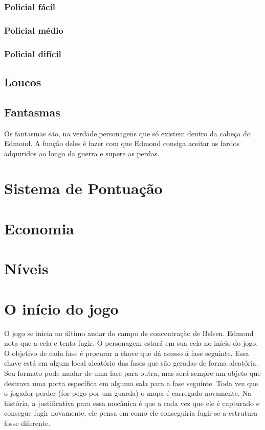 \documentclass{article}
\begin{document}
\subsubsection{Policial fácil}
\subsubsection{Policial médio}
\subsubsection{Policial difícil}
\subsection{Loucos}
\subsection{Fantasmas}
Os fantasmas são, na verdade,personagens que só existem dentro da cabeça do Edmond. A função deles é fazer com que Edmond consiga aceitar os fardos adquiridos ao longo da guerra e supere as perdas.

\section{Sistema de Pontuação}
\section{Economia}
\section{Níveis}

\section{O início do jogo}
    O jogo se inicia no último andar do campo de concentração de Belsen. Edmond nota que a cela e tenta fugir. O personagem estará em sua cela no início do jogo. O objetivo de cada fase é procurar a chave que dá acesso á fase seguinte. Essa chave está em algum local aleatório das fases que são geradas de forma aleatória. Seu formato pode mudar de uma fase para outra, mas será sempre um objeto que destrava uma porta específica em alguma sala para a fase seguinte. Toda vez que o jogador perder (for pego por um guarda) o mapa é carregado novamente. Na história, a justificativa para essa mecânica é que a cada vez que ele é capturado e consegue fugir novamente, ele pensa em como ele conseguiria fugir se a estrutura fosse diferente.
  
\end{document}
